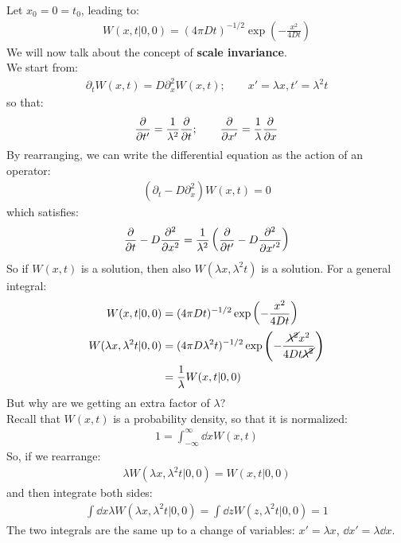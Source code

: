 \documentclass[../template.tex]{subfiles}
\begin{document}
Let $x_0 = 0 = t_0$, leading to:
\begin{align*}
    W(x,t | 0, 0) = (4 \pi D t )^{-1/2} \exp\left(-\frac{x^2}{4 D t} \right)
\end{align*} 
We will now talk about the concept of \textbf{scale invariance}.\\
We start from:
\begin{align*}
    \partial_t W(x,t) = D \partial_x^2 W(x,t); \qquad x'=\lambda x, t' = \lambda^2 t
\end{align*} 
so that:
\begin{align*}
    \pdv{t'} = \frac{1}{\lambda^2}  \pdv{t}; \qquad \pdv{x'} = \frac{1}{\lambda} \pdv{x} 
\end{align*}
By rearranging, we can write the differential equation as the action of an operator:
\begin{align*}
    (\partial_t - D \partial_x^2) W(x,t) = 0
\end{align*}
which satisfies:
\begin{align*}
    \pdv{t} - D \pdv[2]{x} = \frac{1}{\lambda^2} \left(\pdv{t'} - D \pdv[2]{{x'}} \right)  
\end{align*}
So if $W(x,t)$ is a solution, then also $W(\lambda x, \lambda^2 t)$ is a solution. For a general integral:
\begin{align*}
    W(x,t|0,0) &=  (4 \pi D t)^{-1/2} \exp\left(-\frac{x^2}{4D t} \right) \\
    W(\lambda x, \lambda^2 t | 0, 0) &= (4 \pi D \lambda^2 t)^{-1/2} \exp\left(-\frac{\cancel{\lambda^2} x^2}{4 D t\cancel{ \lambda^2}} \right)\\
     &= \frac{1}{\lambda} W(x,t|0,0)  \\
\end{align*}  
But why are we getting an extra factor of $\lambda$?\\
Recall that $W(x,t)$ is a probability density, so that it is normalized:
\begin{align*}
    1 = \int_{-\infty}^{\infty} \dd{x} W(x,t)
\end{align*}  
So, if we rearrange:
\begin{align*}
    \lambda W(\lambda x, \lambda^2 t | 0, 0) = W(x,t | 0,0)
\end{align*}
and then integrate both sides:
\begin{align*}
    \int \dd{x} \lambda W(\lambda x, \lambda^2 t|0,0) = \int \dd{z} W(z, \lambda^2 t|0,0) = 1
\end{align*}
The two integrals are the same up to a change of variables: $x' = \lambda x$, $\dd{x'} = \lambda \dd{x}$.\\
\end{document}

